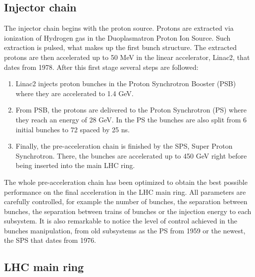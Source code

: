 \subsection{Injector chain}
\label{sec:injector}

The injector chain begins with the proton source. Protons are extracted via ionization of Hydrogen gas in the Duoplasmatron Proton Ion Source. Such extraction is pulsed, what makes up the first bunch structure. The extracted protons are then accelerated up to 50 MeV in the linear accelerator, Linac2, that dates from 1978. After this first stage several steps are followed:
\begin{enumerate}
\item Linac2 injects proton bunches in the Proton Synchrotron Booster (PSB) where they are accelerated to 1.4 GeV. 
\item From PSB, the protons are delivered to the Proton Synchrotron (PS) where they reach an energy of 28 GeV. In the PS the bunches are also split from 6 initial bunches to 72 spaced by 25 ns.
\item Finally, the pre-acceleration chain is finished by the SPS, Super Proton Synchrotron. There, the bunches are accelerated up to 450 GeV right before being inserted into the main LHC ring. 
\end{enumerate}

The whole pre-acceleration chain has been optimized to obtain the best possible performance on the final acceleration in the LHC main ring. All parameters are carefully controlled, for example the number of bunches, the separation between bunches, the separation between trains of bunches or the injection energy to each subsystem. It is also remarkable to notice the level of control achieved in the bunches manipulation, from old subsystems as the PS from 1959 or the newest, the SPS that dates from 1976. 


\subsection{LHC main ring}
\label{sec:ring}

